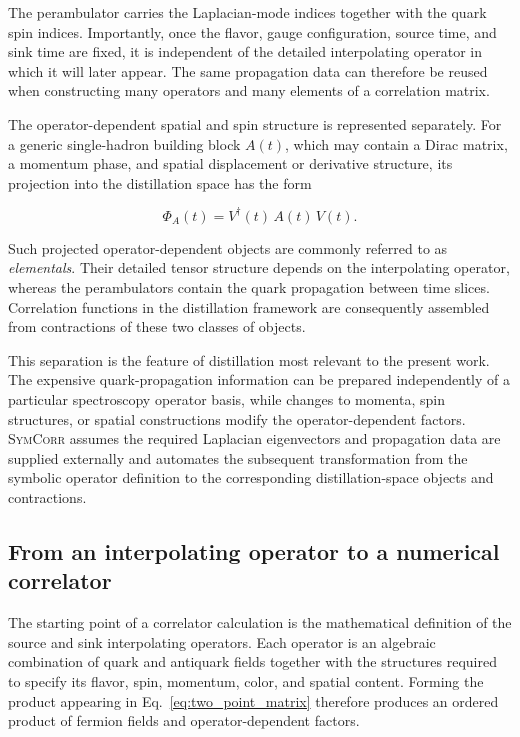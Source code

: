 \documentclass[11pt]{article}
\begin{document}
The perambulator carries the Laplacian-mode indices together with the quark
spin indices. Importantly, once the flavor, gauge configuration, source time,
and sink time are fixed, it is independent of the detailed interpolating
operator in which it will later appear. The same propagation data can therefore
be reused when constructing many operators and many elements of a correlation
matrix.

The operator-dependent spatial and spin structure is represented separately.
For a generic single-hadron building block \(A(t)\), which may contain a Dirac
matrix, a momentum phase, and spatial displacement or derivative structure, its
projection into the distillation space has the form

\begin{equation}
\Phi_A(t)
=
V^\dagger(t)\,A(t)\,V(t).
\label{eq:elemental}
\end{equation}

Such projected operator-dependent objects are commonly referred to as
\emph{elementals}. Their detailed tensor structure depends on the interpolating
operator, whereas the perambulators contain the quark propagation between time
slices. Correlation functions in the distillation framework are consequently
assembled from contractions of these two classes of objects.

This separation is the feature of distillation most relevant to the present
work. The expensive quark-propagation information can be prepared independently
of a particular spectroscopy operator basis, while changes to momenta, spin
structures, or spatial constructions modify the operator-dependent factors.
\textsc{SymCorr} assumes the required Laplacian eigenvectors and propagation
data are supplied externally and automates the subsequent transformation from
the symbolic operator definition to the corresponding distillation-space
objects and contractions.

\subsection{From an interpolating operator to a numerical correlator}

The starting point of a correlator calculation is the mathematical definition
of the source and sink interpolating operators. Each operator is an algebraic
combination of quark and antiquark fields together with the structures required
to specify its flavor, spin, momentum, color, and spatial content. Forming the
product appearing in Eq.~\eqref{eq:two_point_matrix} therefore produces an
ordered product of fermion fields and operator-dependent factors.
\end{document}
